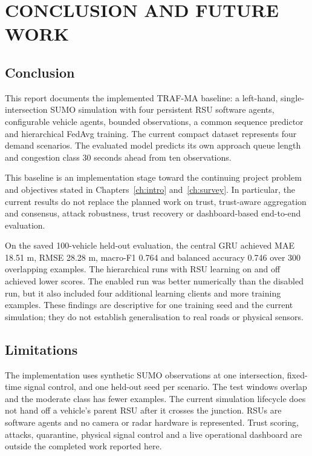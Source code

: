 \chapter{CONCLUSION AND FUTURE WORK}\label{ch:conclusion}

\section{Conclusion}
This report documents the implemented TRAF-MA baseline: a left-hand, single-intersection SUMO simulation with four persistent RSU software agents, configurable vehicle agents, bounded observations, a common sequence predictor and hierarchical FedAvg training. The current compact dataset represents four demand scenarios. The evaluated model predicts its own approach queue length and congestion class 30 seconds ahead from ten observations.

This baseline is an implementation stage toward the continuing project problem and objectives stated in Chapters~\ref{ch:intro} and~\ref{ch:survey}. In particular, the current results do not replace the planned work on trust, trust-aware aggregation and consensus, attack robustness, trust recovery or dashboard-based end-to-end evaluation.

On the saved 100-vehicle held-out evaluation, the central GRU achieved MAE 18.51 m, RMSE 28.28 m, macro-F1 0.764 and balanced accuracy 0.746 over 300 overlapping examples. The hierarchical runs with RSU learning on and off achieved lower scores. The enabled run was better numerically than the disabled run, but it also included four additional learning clients and more training examples. These findings are descriptive for one training seed and the current simulation; they do not establish generalisation to real roads or physical sensors.

\section{Limitations}
The implementation uses synthetic SUMO observations at one intersection, fixed-time signal control, and one held-out seed per scenario. The test windows overlap and the moderate class has fewer examples. The current simulation lifecycle does not hand off a vehicle's parent RSU after it crosses the junction. RSUs are software agents and no camera or radar hardware is represented. Trust scoring, attacks, quarantine, physical signal control and a live operational dashboard are outside the completed work reported here.

